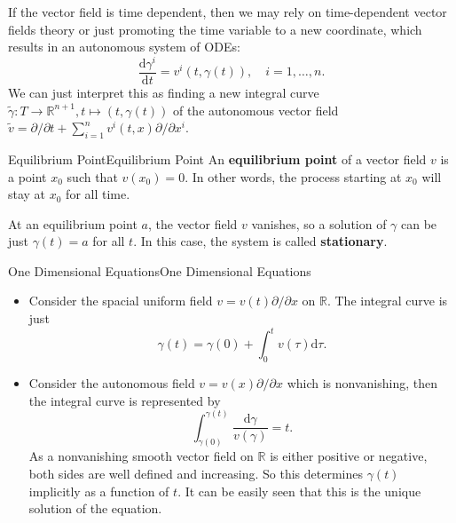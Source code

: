 \documentclass[../main.tex]{subfiles}
\begin{document}
If the vector field is time dependent, then we may rely on time-dependent vector fields theory or just promoting the time variable to a new coordinate, which results in an autonomous system of ODEs:
\begin{equation}
  \frac{\mathrm{d} \gamma^i}{\mathrm{d} t} = v^i(t, \gamma(t)), \quad i = 1, \dots, n.
\end{equation}
We can just interpret this as finding a new integral curve $\tilde{\gamma}: T \to \mathbb{R}^{n+1}, t \mapsto (t, \gamma(t))$ of the autonomous vector field $\tilde{v} = \partial / \partial t + \sum_{i=1}^n v^i(t, x) \partial / \partial x^i$.

\begin{definition}{Equilibrium Point}{Equilibrium Point}
  An \textbf{equilibrium point} of a vector field $v$ is a point $x_0$ such that $v(x_0) = 0$. In other words, the process starting at $x_0$ will stay at $x_0$ for all time.  
\end{definition}

At an equilibrium point $a$, the vector field $v$ vanishes, so a solution of $\gamma$ can be just $\gamma(t) = a$ for all $t$. In this case, the system is called \textbf{stationary}.

\begin{example}{One Dimensional Equations}{One Dimensional Equations}
  \begin{itemize}
    \item Consider the spacial uniform field $v = v(t) \partial / \partial x$ on $\mathbb{R}$. The integral curve is just
      \begin{equation*}
        \gamma(t) = \gamma(0) + \int_0^t v(\tau) \mathrm{d} \tau.
      \end{equation*}
    \item Consider the autonomous field $v = v(x) \partial / \partial x$ which is nonvanishing, then the integral curve is represented by
      \begin{equation}
        \int_{\gamma(0)}^{\gamma(t)} \frac{\mathrm{d} \gamma}{v(\gamma)} = t.
      \end{equation}
      As a nonvanishing smooth vector field on $\mathbb{R}$ is either positive or negative, both sides are well defined and increasing. So this determines $\gamma(t)$ implicitly as a function of $t$. It can be easily seen that this is the unique solution of the equation.
  \end{itemize}
\end{example}
\end{document}
